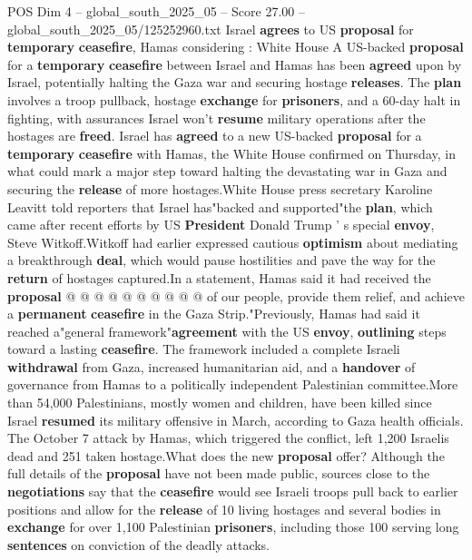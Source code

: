 \begin{textsample}{POS Dim 4 – global\_south\_2025\_05 – Score 27.00 – global\_south\_2025\_05/125252960.txt}  \label{ex:f4_pos_091}
Israel \textbf{agrees} to US \textbf{proposal} for \textbf{temporary} \textbf{ceasefire}, Hamas considering : White House A US-backed \textbf{proposal} for a \textbf{temporary} \textbf{ceasefire} between Israel and Hamas has been \textbf{agreed} upon by Israel, potentially halting the Gaza war and securing hostage \textbf{releases}.
The \textbf{plan} involves a troop pullback, hostage \textbf{exchange} for \textbf{prisoners}, and a 60-day halt in fighting, with assurances Israel won't \textbf{resume} military operations after the hostages are \textbf{freed}.
Israel has \textbf{agreed} to a new US-backed \textbf{proposal} for a \textbf{temporary} \textbf{ceasefire} with Hamas, the White House confirmed on Thursday, in what could mark a major step toward halting the devastating war in Gaza and securing the \textbf{release} of more hostages.White House press secretary Karoline Leavitt told reporters that Israel has"backed and supported"the \textbf{plan}, which came after recent efforts by US \textbf{President} Donald Trump ' s special \textbf{envoy}, Steve Witkoff.Witkoff had earlier expressed cautious \textbf{optimism} about mediating a breakthrough \textbf{deal}, which would pause hostilities and pave the way for the \textbf{return} of hostages captured.In a statement, Hamas said it had received the \textbf{proposal} @ @ @ @ @ @ @ @ @ @ of our people, provide them relief, and achieve a \textbf{permanent} \textbf{ceasefire} in the Gaza Strip."Previously, Hamas had said it reached a"general framework"\textbf{agreement} with the US \textbf{envoy}, \textbf{outlining} steps toward a lasting \textbf{ceasefire}.
The framework included a complete Israeli \textbf{withdrawal} from Gaza, increased humanitarian aid, and a \textbf{handover} of governance from Hamas to a politically independent Palestinian committee.More than 54,000 Palestinians, mostly women and children, have been killed since Israel \textbf{resumed} its military offensive in March, according to Gaza health officials.
The October 7 attack by Hamas, which triggered the conflict, left 1,200 Israelis dead and 251 taken hostage.What does the new \textbf{proposal} offer?
Although the full details of the \textbf{proposal} have not been made public, sources close to the \textbf{negotiations} say that the \textbf{ceasefire} would see Israeli troops pull back to earlier positions and allow for the \textbf{release} of 10 living hostages and several bodies in \textbf{exchange} for over 1,100 Palestinian \textbf{prisoners}, including those 100 serving long \textbf{sentences} on conviction of the deadly attacks.

\end{textsample}
